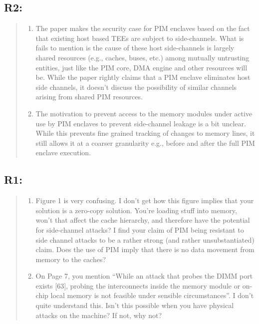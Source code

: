 \documentclass[11pt]{article}
\begin{document}
\subsection{R2:}
\label{sec:org66ffa93}
\begin{quote}
\begin{enumerate}
\item The paper makes the security case for PIM enclaves based on the fact that existing host based TEEs are subject to side-channels. What is fails to mention is the cause of these host side-channels is largely shared resources (e.g., caches, buses, etc.) among mutually untrusting entities, just like the PIM core, DMA engine and other resources will be. While the paper rightly claims that a PIM enclave eliminates host side channels, it doesn't discuss the possibility of similar channels arising from shared PIM resources.
\item The motivation to prevent access to the memory modules under active use by PIM enclaves to prevent side-channel leakage is a bit unclear. While this prevents fine grained tracking of changes to memory lines, it still allows it at a coarser granularity e.g., before and after the full PIM enclave execution.
\end{enumerate}
\end{quote}
\subsection{R1:}
\label{sec:org860e598}
\begin{quote}
\begin{enumerate}
\item Figure 1 is very confusing. I don't get how this figure implies that your solution is a zero-copy solution. You're loading stuff into memory, won't that affect the cache hierarchy, and therefore have the potential for side-channel attacks? I find your claim of PIM being resistant to side channel attacks to be a rather strong (and rather unsubstantiated) claim. Does the use of PIM imply that there is no data movement from memory to the caches?
\item On Page 7, you mention ``While an attack that probes the DIMM port exists [63], probing the interconnects inside the memory module or on-chip local memory is not feasible under sensible circumstances''. I don't quite understand this. Isn't this possible when you have physical attacks on the machine? If not, why not?
\end{enumerate}
\end{quote}
\end{document}
